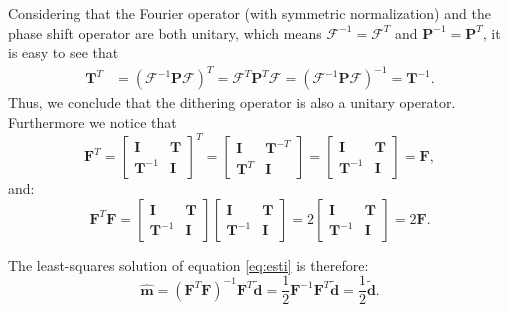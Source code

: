 Considering that the Fourier operator (with symmetric normalization) and the phase shift operator are both unitary, which means $\mathbf{\mathcal{F}}^{-1}=\mathbf{\mathcal{F}}^{T}$ and $\mathbf{P}^{-1}=\mathbf{P}^T$, it is easy to see that 
\begin{equation}
\label{eq:unitary}
\begin{split}
\mathbf{T}^T &=(\mathbf{\mathcal{F}}^{-1}\mathbf{P}\mathbf{\mathcal{F}})^T =\mathbf{\mathcal{F}}^T\mathbf{\mathbf{P}}^T\mathbf{\mathcal{F}} =(\mathbf{\mathcal{F}}^{-1}\mathbf{P}\mathbf{\mathcal{F}})^{-1} =\mathbf{T}^{-1}.
\end{split}
\end{equation}
Thus, we conclude that the dithering operator is also a unitary operator.\\
Furthermore we notice that
\begin{equation}
\label{eq:back2}
\mathbf{F}^T=
\left[\begin{array}{cc}
\mathbf{I} 	& \mathbf{T}\\
\mathbf{T}^{-1} & \mathbf{I}
\end{array}\right]^T=
\left[\begin{array}{cc}
\mathbf{I} 	& \mathbf{T}^{-T}\\
\mathbf{T}^{T} & \mathbf{I}
\end{array}\right]=
\left[\begin{array}{cc}
\mathbf{I} 	& \mathbf{T}\\
\mathbf{T}^{-1} & \mathbf{I}
\end{array}\right]=
\mathbf{F}, \nonumber 
\end{equation}
and:
\begin{equation}
\label{eq:back3}
\mathbf{F}^T\mathbf{F}=\left[\begin{array}{cc}
\mathbf{I} 	& \mathbf{T}\\
\mathbf{T}^{-1} & \mathbf{I}
\end{array}\right]
\left[\begin{array}{cc}
\mathbf{I} 	& \mathbf{T}\\
\mathbf{T}^{-1} & \mathbf{I}
\end{array}\right]=
2\left[\begin{array}{cc}
\mathbf{I} 	& \mathbf{T}\\
\mathbf{T}^{-1} & \mathbf{I}
\end{array}\right]=
2\mathbf{F}.
\end{equation}

The least-squares solution of equation \ref{eq:esti} is therefore:
\begin{equation}
\label{eq:solu}
\mathbf{\hat{m}}=(\mathbf{F}^T\mathbf{F})^{-1}\mathbf{F}^{T}\mathbf{\tilde{d}}=\frac{1}{2}\mathbf{F}^{-1}\mathbf{F}^T\mathbf{\tilde{d}}=\frac{1}{2}\mathbf{\tilde{d}}.
\end{equation}

